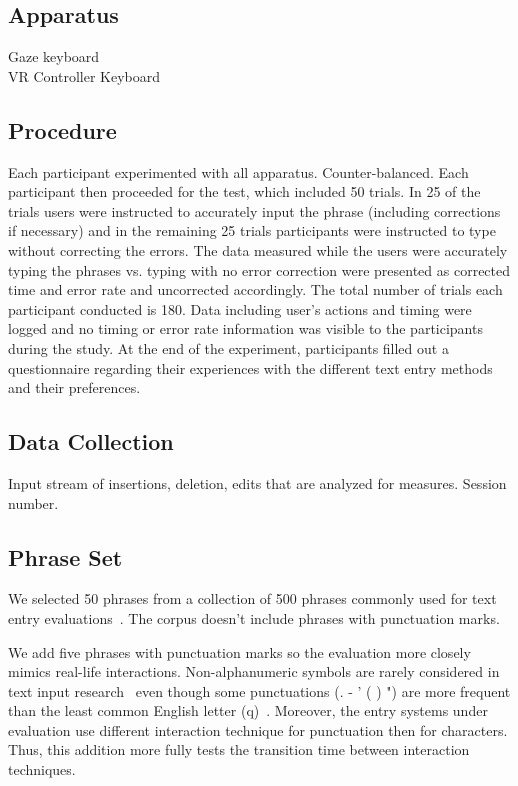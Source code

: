 \subsection{Apparatus}
Gaze keyboard\\
VR Controller Keyboard

\subsection{Procedure}
Each participant experimented with all apparatus.
Counter-balanced.
Each participant then proceeded for the test, which included 50 trials.
In 25 of the trials users were instructed to accurately input the phrase (including corrections if necessary) and in the remaining 25 trials participants were instructed to type without correcting the errors.
The data measured while the users were accurately typing the phrases vs. typing with no error correction were presented as corrected time and error rate and uncorrected accordingly.
The total number of trials each participant conducted is 180.
Data including user's actions and timing were logged and no timing or error rate information was visible to the participants during the study.
At the end of the experiment, participants filled out a questionnaire regarding their experiences with the different text entry methods and their preferences.

\subsection{Data Collection}
Input stream of insertions, deletion, edits that are analyzed for measures. Session number.

\subsection{Phrase Set}
We selected 50 phrases from a collection of 500 phrases commonly used for text entry evaluations~\cite{mackenzie2003phrase}.
The corpus doesn't include phrases with punctuation marks.  

We add five phrases with punctuation marks so the evaluation more closely mimics real-life interactions.
Non-alphanumeric symbols are rarely considered in text input research~\cite{mackenzie2003phrase} even though some punctuations (. - ' ( ) ") are more frequent than the least common English letter (q)~\cite{malikpunctuation}.
Moreover, the entry systems under evaluation use different interaction technique for punctuation then for characters.
Thus, this addition more fully tests the transition time between interaction techniques. 

